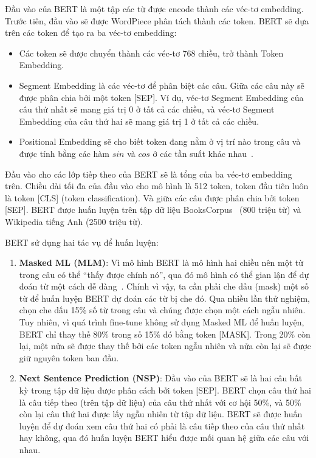 Đầu vào của BERT là một tập các từ được encode thành các véc-tơ embedding.  Trước tiên, đầu vào sẽ được WordPiece phân tách thành các token. BERT sẽ dựa trên các token để tạo ra ba véc-tơ embedding:
\begin{itemize}
	\item Các token sẽ được chuyển thành các véc-tơ 768 chiều, trở thành Token Embedding.
	\item Segment Embedding là các véc-tơ để phân biệt các câu. Giữa các câu này sẽ được phân chia bởi một token [SEP]. Ví dụ, véc-tơ Segment Embedding của câu thứ nhất sẽ mang giá trị 0 ở tất cả các chiều, và véc-tơ Segment Embedding của câu thứ hai sẽ mang giá trị 1 ở tất cả các chiều.
	\item Positional Embedding sẽ cho biết token đang nằm ở vị trí nào trong câu và được tính bằng các hàm $sin$ và $cos$ ở các tần suất khác nhau~\cite{vaswaniAttentionAllYou2017}.
\end{itemize}


Đầu vào cho các lớp tiếp theo của BERT sẽ là tổng của ba véc-tơ embedding trên.  Chiều dài tối đa của đầu vào cho mô hình là 512 token, token đầu tiên luôn là token [CLS] (token classification). Và giữa các câu được phân chia bởi token [SEP]. BERT được huấn luyện trên tập dữ liệu BooksCorpus~\cite{zhuAligningBooksMovies2015} (800 triệu từ) và Wikipedia tiếng Anh (2500 triệu từ).

BERT sử dụng hai tác vụ để huấn luyện:

\begin{enumerate}
	\item \textbf{Masked ML (MLM)}: Vì mô hình BERT là mô hình hai chiều nên một từ trong câu có thể ``thấy được chính nó'', qua đó mô hình có thể gian lận để dự đoán từ một cách dễ dàng~\cite{devlinBERTPretrainingDeep2019}. Chính vì vậy, ta cần phải che dấu (mask) một số từ để huấn luyện BERT dự đoán các từ bị che đó.  Qua nhiều lần thử nghiệm, \cite{devlinBERTPretrainingDeep2019} chọn che dấu 15\% số từ trong câu và chúng được chọn một cách ngẫu nhiên. Tuy nhiên, vì quá trình fine-tune không sử dụng Masked ML để huấn luyện, BERT chỉ thay thế 80\% trong số 15\% đó bằng token [MASK]. Trong 20\% còn lại, một nửa sẽ được thay thế bởi các token ngẫu nhiên và nửa còn lại sẽ được giữ nguyên token ban đầu.
	\item \textbf{Next Sentence Prediction (NSP)}: Đầu vào của BERT sẽ là hai câu bất kỳ trong tập dữ liệu được phân cách bởi token [SEP]. BERT chọn câu thứ hai là câu tiếp theo (trên tập dữ liệu) của câu thứ nhất với cơ hội 50\%, và 50\% còn lại câu thứ hai được lấy ngẫu nhiên từ tập dữ liệu. BERT sẽ được huấn luyện để dự đoán xem câu thứ hai có phải là câu tiếp theo của câu thứ nhất hay không, qua đó huấn luyện BERT hiểu được mối quan hệ giữa các câu với nhau.
\end{enumerate}

